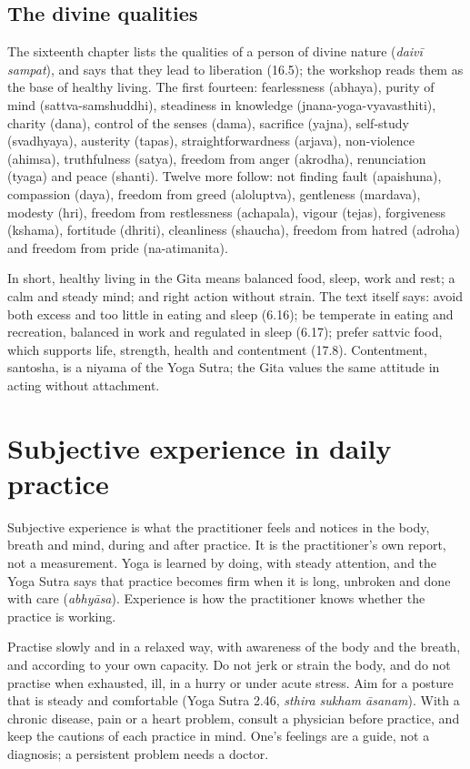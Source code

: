 \subsection*{The divine qualities}
The sixteenth chapter lists the qualities of a person of divine nature (\emph{daivī sampat}), and says that they lead to liberation (16.5); the workshop reads them as the base of healthy living. The first fourteen: fearlessness (abhaya), purity of mind (sattva-samshuddhi), steadiness in knowledge (jnana-yoga-vyavasthiti), charity (dana), control of the senses (dama), sacrifice (yajna), self-study (svadhyaya), austerity (tapas), straightforwardness (arjava), non-violence (ahimsa), truthfulness (satya), freedom from anger (akrodha), renunciation (tyaga) and peace (shanti). Twelve more follow: not finding fault (apaishuna), compassion (daya), freedom from greed (aloluptva), gentleness (mardava), modesty (hri), freedom from restlessness (achapala), vigour (tejas), forgiveness (kshama), fortitude (dhriti), cleanliness (shaucha), freedom from hatred (adroha) and freedom from pride (na-atimanita).

In short, healthy living in the Gita means balanced food, sleep, work and rest; a calm and steady mind; and right action without strain. The text itself says: avoid both excess and too little in eating and sleep (6.16); be temperate in eating and recreation, balanced in work and regulated in sleep (6.17); prefer sattvic food, which supports life, strength, health and contentment (17.8). Contentment, santosha, is a niyama of the Yoga Sutra; the Gita values the same attitude in acting without attachment.

\section{Subjective experience in daily practice}

Subjective experience is what the practitioner feels and notices in the body, breath and mind, during and after practice. It is the practitioner's own report, not a measurement. Yoga is learned by doing, with steady attention, and the Yoga Sutra says that practice becomes firm when it is long, unbroken and done with care (\emph{abhyāsa}). Experience is how the practitioner knows whether the practice is working.

Practise slowly and in a relaxed way, with awareness of the body and the breath, and according to your own capacity. Do not jerk or strain the body, and do not practise when exhausted, ill, in a hurry or under acute stress. Aim for a posture that is steady and comfortable (Yoga Sutra 2.46, \emph{sthira sukham āsanam}). With a chronic disease, pain or a heart problem, consult a physician before practice, and keep the cautions of each practice in mind. One's feelings are a guide, not a diagnosis; a persistent problem needs a doctor.

